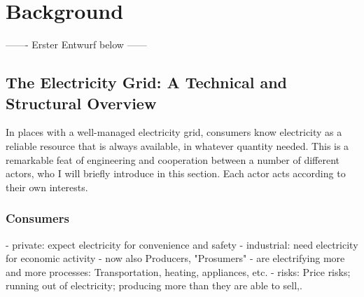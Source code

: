 
\chapter{Background}
  \label{background}












------- Erster Entwurf below ------

\section{The Electricity Grid: A Technical and Structural Overview}
In places with a well-managed electricity grid, consumers know electricity as a reliable resource that is always available, in whatever quantity needed.
This is a remarkable feat of engineering and cooperation between a number of different actors, who I will briefly introduce in this section.
Each actor acts according to their own interests.



\subsection{Consumers}
- private: expect electricity for convenience and safety
- industrial: need electricity for economic activity
- now also Producers, "Prosumers"
- are electrifying more and more processes: Transportation, heating, appliances, etc.
- risks: Price risks; running out of electricity; producing more than they are able to sell,.

